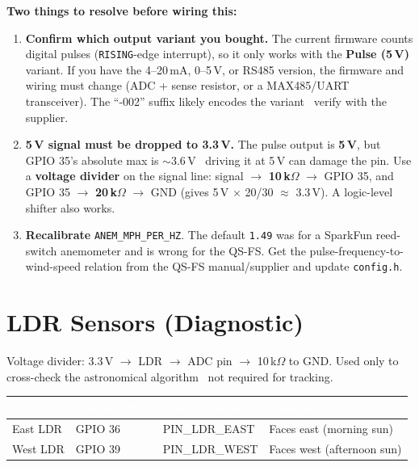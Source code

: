 \documentclass[11pt]{article}
\newcommand{\tc}[1]{\textcolor{white}{\textbf{#1}}}   %
\newcommand{\nd}{\textrm{\textemdash}}                %
\begin{document}
\begin{warnbox}
\textbf{Two things to resolve before wiring this:}
\begin{enumerate}
  \item \textbf{Confirm which output variant you bought.} The current firmware
        counts digital pulses (\texttt{RISING}-edge interrupt), so it only works
        with the \textbf{Pulse (5\,V)} variant. If you have the 4--20\,mA, 0--5\,V,
        or RS485 version, the firmware and wiring must change (ADC + sense
        resistor, or a MAX485/UART transceiver). The ``-002'' suffix likely
        encodes the variant \nd\ verify with the supplier.
  \item \textbf{5\,V signal must be dropped to 3.3\,V.} The pulse output is
        \textbf{5\,V}, but GPIO 35's absolute max is $\sim$3.6\,V \nd\ driving it
        at 5\,V can damage the pin. Use a \textbf{voltage divider} on the signal
        line: signal $\rightarrow$ \textbf{10\,k$\Omega$} $\rightarrow$ GPIO 35,
        and GPIO 35 $\rightarrow$ \textbf{20\,k$\Omega$} $\rightarrow$ GND (gives
        5\,V $\times$ 20/30 $\approx$ 3.3\,V). A logic-level shifter also works.
  \item \textbf{Recalibrate} \texttt{ANEM_MPH_PER_HZ}. The default \texttt{1.49}
        was for a SparkFun reed-switch anemometer and is wrong for the QS-FS. Get
        the pulse-frequency-to-wind-speed relation from the QS-FS manual/supplier
        and update \texttt{config.h}.
\end{enumerate}
\end{warnbox}

\section*{LDR Sensors (Diagnostic)}
Voltage divider: 3.3\,V $\rightarrow$ LDR $\rightarrow$ ADC pin $\rightarrow$
10\,k$\Omega$ to GND. Used only to cross-check the astronomical algorithm \nd\ not
required for tracking.

\smallskip
{}
\begin{xltabular}{\textwidth}{@{}P{2.4cm} P{2.4cm} T{2.8cm} L@{}}
\toprule
{}\tc{LDR} & \tc{ESP32 GPIO} & \tc{Config symbol} & \tc{Position}\\
\midrule\endhead
East LDR & GPIO 36 & PIN_LDR_EAST & Faces east (morning sun)\\
West LDR & GPIO 39 & PIN_LDR_WEST & Faces west (afternoon sun)\\
\bottomrule
\end{xltabular}
\end{document}
